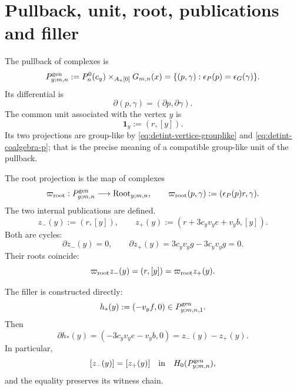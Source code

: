\section{Pullback, unit, root, publications and filler}

The pullback of complexes is
\begin{equation}\label{eq:detint-pgen}
 P^{\rm gen}_{y;m,n}
 :=P_n^0(c_y)\times_{A_n[0]}G_{m,n}(x)
 =\{(p,\gamma):\epsilon_P(p)=\epsilon_G(\gamma)\}.
\end{equation}
Its differential is
\begin{equation}\label{eq:detint-pgen-d}
 \partial(p,\gamma)=(\partial p,\partial\gamma).
\end{equation}
The common unit associated with the vertex \(y\) is
\begin{equation}\label{eq:detint-unidad}
 \mathbf1_y:=(r,[y]).
\end{equation}
Its two projections are group-like by
\eqref{eq:detint-vertice-grouplike} and
\eqref{eq:detint-coalgebra-p}; that is the precise meaning of a compatible
group-like unit of the pullback.

The root projection is the map of complexes
\begin{equation}\label{eq:detint-proyeccion-root}
 \varpi_{\rm root}:P^{\rm gen}_{y;m,n}\longrightarrow
 \operatorname{Root}_{y;m,n},
 \qquad
 \varpi_{\rm root}(p,\gamma):=(\epsilon_P(p)r,\gamma).
\end{equation}
The two internal publications are defined.
\begin{equation}\label{eq:detint-zpm}
 z_-(y):=(r,[y]),
 \qquad
 z_+(y):=(r+3c_yv_ye+v_yb,[y]).
\end{equation}
Both are cycles:
\begin{equation}\label{eq:detint-zpm-ciclos}
 \partial z_-(y)=0,
 \qquad
 \partial z_+(y)=3c_yv_yg-3c_yv_yg=0.
\end{equation}
Their roots coincide:
\begin{equation}\label{eq:detint-raiz-comun}
 \varpi_{\rm root}z_-(y)
 =(r,[y])
 =\varpi_{\rm root}z_+(y).
\end{equation}

The filler is constructed directly:
\begin{equation}\label{eq:detint-hstar}
 h_*(y):=(-v_yf,0)\in P^{\rm gen}_{y;m,n,1}.
\end{equation}
Then
\begin{equation}\label{eq:detint-filler-identidad}
 \partial h_*(y)
 =(-3c_yv_ye-v_yb,0)
 =z_-(y)-z_+(y).
\end{equation}
In particular,
\begin{equation}\label{eq:detint-clases-iguales}
 [z_-(y)]=[z_+(y)]
 \quad\text{in}\quad H_0(P^{\rm gen}_{y;m,n}),
\end{equation}
and the equality preserves its witness chain.

